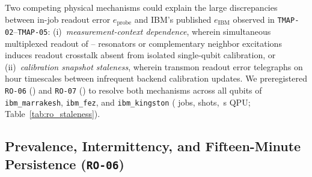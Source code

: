 \documentclass[twocolumn,aps,prapplied,superscriptaddress,floatfix]{revtex4-2}
\begin{document}
Two competing physical mechanisms could explain the large discrepancies between in-job readout error $e_{\mathrm{probe}}$ and IBM's published $e_{\mathrm{IBM}}$ observed in \texttt{TMAP-02}--\texttt{TMAP-05}: (i)~\emph{measurement-context dependence}, wherein simultaneous multiplexed readout of \TmapCircuitQubits{}--\ChipQubits{} resonators or complementary neighbor excitations induces readout crosstalk absent from isolated single-qubit calibration, or (ii)~\emph{calibration snapshot staleness}, wherein transmon readout error telegraphs on hour timescales between infrequent backend calibration updates. We preregistered \texttt{RO-06} (\texttt{\DoiRoSixPrereg}) and \texttt{RO-07} (\texttt{\DoiRoSevenPrereg}) to resolve both mechanisms across all \ChipQubits{} qubits of \texttt{ibm\_marrakesh}, \texttt{ibm\_fez}, and \texttt{ibm\_kingston} (\RoSeriesJobs{} jobs, \RoSeriesShots{} shots, \RoSeriesSeconds{}\,s QPU; Table~\ref{tab:ro_staleness}).

\subsection{Prevalence, Intermittency, and Fifteen-Minute Persistence (\texttt{RO-06})}
\end{document}
